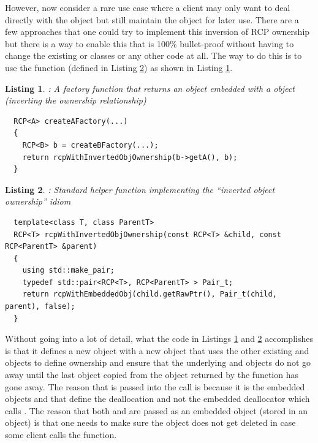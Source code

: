 \documentclass[pdf,ps2pdf,11pt]{SANDreport}
\newtheorem{listing}{Listing}
\begin{document}
However, now consider a rare use case where a client may only want to
deal directly with the {} object but still maintain the
{} object for later use.  There are a few approaches that
one could try to implement this inversion of RCP ownership but there
is a way to enable this that is 100\% bullet-proof without having to
change the existing {} or {} classes or any other
code at all.  The way to do this is to use the
{} function (defined in
Listing {}\ref{listing:rcpWithInvertedObjOwnership}) as shown in
Listing {}\ref{listing:A_owns_B_owns_A}.

\begin{listing}: A factory function that returns an {} object
embedded with a {} object (inverting the ownership relationship) \\
\label{listing:A_owns_B_owns_A}
{\small\begin{verbatim}
  RCP<A> createAFactory(...)
  {
    RCP<B> b = createBFactory(...);
    return rcpWithInvertedObjOwnership(b->getA(), b);
  }
\end{verbatim}}
\end{listing}


\begin{listing}: Standard helper function implementing the ``inverted
object ownership'' idiom \\
\label{listing:rcpWithInvertedObjOwnership}
{\small\begin{verbatim}
  template<class T, class ParentT>
  RCP<T> rcpWithInvertedObjOwnership(const RCP<T> &child, const RCP<ParentT> &parent)
  {
    using std::make_pair;
    typedef std::pair<RCP<T>, RCP<ParentT> > Pair_t;
    return rcpWithEmbeddedObj(child.getRawPtr(), Pair_t(child, parent), false);
  }
\end{verbatim}}
\end{listing}




Without going into a lot of detail, what the code in Listings
{}\ref{listing:A_owns_B_owns_A} and
{}\ref{listing:rcpWithInvertedObjOwnership} accomplishes is that it defines a
new {} object with a new {} object that uses the
other existing {} and {} objects to define ownership
and ensure that the underlying {} and {} objects do not go away
until the last {} object copied from the object returned by the
function {} has gone away.  The reason that
{} is passed into the {} call is
because it is the embedded objects {} and {} that
define the deallocation and not the embedded deallocator which calls
{}.  The reason that both {} and {} are
passed as an embedded object (stored in an {} object) is that
one needs to make sure the {} object does not get deleted in case some
client calls the {} function.
\end{document}
